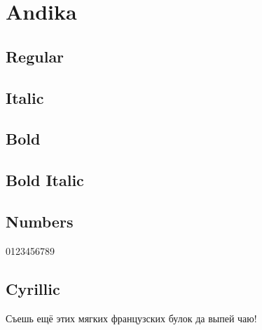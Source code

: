 \documentclass{article}
\begin{document}
\section*{Andika}

\subsection*{Regular}
\lipsum[1]  

\subsection*{Italic}
\textit{\lipsum[2]}

\subsection*{Bold}

\textbf{\lipsum[3]}



\subsection*{Bold Italic}

\textbf{\textit{\lipsum[4]}}

\subsection*{Numbers}

0123456789

\subsection*{Cyrillic}

{\ifxetex\else\ifluatex\else{}\selectfont\fi\fi
Съешь ещё этих мягких французских булок да
выпей чаю!}
\end{document}
